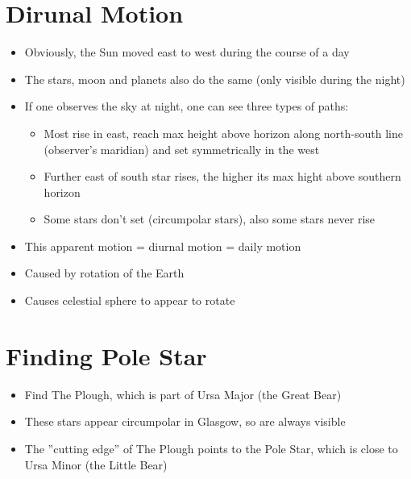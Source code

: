 \documentclass[a4paper, 11pt]{article}
\begin{document}
\section{Dirunal Motion}
\begin{itemize}
\item Obviously, the Sun moved east to west during the course of a day
\item The stars, moon and planets also do the same (only visible during the night)
\item If one observes the sky at night, one can see three types of paths:
	\begin{itemize}
	\item Most rise in east, reach max height above horizon along north-south line (observer's maridian) and set symmetrically in the west
	\item Further east of south star rises, the higher its max hight above southern horizon
	\item Some stars don't set (circumpolar stars), also some stars never rise
	\end{itemize}
\item This apparent motion = diurnal motion = daily motion
\item Caused by rotation of the Earth
\item Causes celestial sphere to appear to rotate
\end{itemize}

\section{Finding Pole Star}
\begin{itemize}
\item Find The Plough, which is part of Ursa Major (the Great Bear)
\item These stars appear circumpolar in Glasgow, so are always visible
\item The ''cutting edge'' of The Plough points to the Pole Star, which is close to Ursa Minor (the Little Bear)
\end{itemize}
\end{document}
